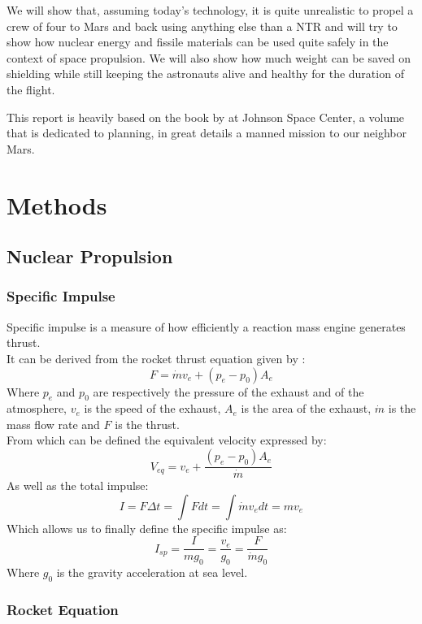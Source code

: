 \documentclass[12pt,a4paper]{report}
\begin{document}
We will show that, assuming today's technology, it is quite unrealistic to propel a crew of four to Mars and back using anything else than a NTR and will try to show how nuclear energy and fissile materials can be used quite safely in the context of space propulsion. We will also show how much weight can be saved on shielding while still keeping the astronauts alive and healthy for the duration of the flight.

This report is heavily based on the book by \citet{hoffman1997} at Johnson Space Center, a volume that is dedicated to planning, in great details a manned mission to our neighbor Mars.


\chapter{Methods}

\section{Nuclear Propulsion}
\subsection{Specific Impulse}
Specific impulse is a measure of how efficiently a reaction mass engine generates thrust.\\
It can be derived from the rocket thrust equation given by :
\begin{equation}
F = \dot{m}v_e + (p_e - p_0)A_e 
\end{equation}
Where $p_e$ and $p_0$ are respectively the pressure of the exhaust and of the atmosphere, $v_e$ is the speed of the exhaust, $A_e$ is the area of the exhaust, $\dot{m}$ is the mass flow rate and $F$ is the thrust.\\
From which can be defined the equivalent velocity expressed by:
$$V_{eq}=v_e+\frac{(p_e-p_0)A_e}{\dot{m}}$$
As well as the total impulse:
$$I=F\Delta t = \int F dt = \int \dot{m}v_{e}dt=mv_{e}$$
Which allows us to finally define the specific impulse as:
\begin{equation}
I_{sp}=\frac{I}{mg_0}=\frac{v_{e}}{g_0}=\frac{F}{\dot{m}g_0}
\end{equation}
Where $g_0$ is the gravity acceleration at sea level.
\newpage
\subsection{Rocket Equation}
\end{document}
